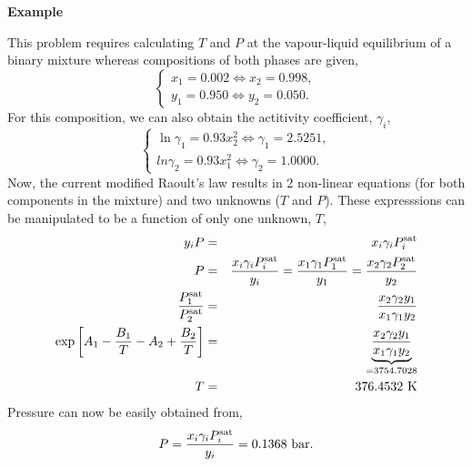 \begin{MyExample}{\begin{center}{\bf Example}\end{center}}
            This problem requires calculating $T$ and $P$ at the vapour-liquid equilibrium of a binary mixture whereas compositions of both phases are given,
            \begin{displaymath}
               \begin{cases}
                  x_{1} = 0.002 \Leftrightarrow x_{2} = 0.998,\\
                  y_{1} = 0.950 \Leftrightarrow y_{2} = 0.050.
               \end{cases}
            \end{displaymath}
            For this composition, we can also obtain the actitivity coefficient, $\gamma_{i}$,
            \begin{displaymath}
               \begin{cases}
                  \ln{\gamma_{1}} = 0.93x_{2}^{2} \Leftrightarrow \gamma_{1} = 2.5251,\\
                   ln{\gamma_{2}} = 0.93x_{1}^{2} \Leftrightarrow \gamma_{2} = 1.0000.
               \end{cases}
            \end{displaymath}
            Now, the current modified Raoult's law results in 2 non-linear equations (for both components in the mixture) and two unknowns ($T$ and $P$). These expresssions can be manipulated to be a function of only one unknown, $T$,
            \begin{eqnarray}
                y_{i} P &=& x_{i}\gamma_{i}P_{i}^{\text{sat}} \nonumber \\
                     P &=& \displaystyle\frac{x_{i}\gamma_{i}P_{i}^{\text{sat}}}{y_{i}} =  \displaystyle\frac{x_{1}\gamma_{1}P_{1}^{\text{sat}}}{y_{1}} = \displaystyle\frac{x_{2}\gamma_{2}P_{2}^{\text{sat}}}{y_{2}} \nonumber \\
                \displaystyle\frac{P_{1}^{\text{sat}}}{P_{2}^{\text{sat}}}  &=& \displaystyle\frac{x_{2}\gamma_{2}y_{1}}{x_{1}\gamma_{1}y_{2}} \nonumber \\
                \exp{\left[A_{1}-\displaystyle\frac{B_{1}}{T}-A_{2}+\displaystyle\frac{B_{2}}{T}\right]} &=& \underbrace{\displaystyle\frac{x_{2}\gamma_{2}y_{1}}{x_{1}\gamma_{1}y_{2}}}_{= 3754.7028} \nonumber \\
                         T&=& 376.4532\text{ K} \nonumber
            \end{eqnarray}
            Pressure can now be easily obtained from,
            \begin{displaymath}
                 P = \displaystyle\frac{x_{i}\gamma_{i}P_{i}^{\text{sat}}}{y_{i}} = 0.1368\text{ bar}.
            \end{displaymath}
   \end{MyExample} 


